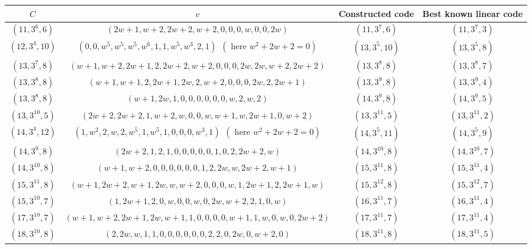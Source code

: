 \documentclass[sn-mathphys-num]{sn-jnl}%
\theoremstyle{thmstyleone}%
\theoremstyle{thmstyletwo}%
\theoremstyle{thmstylethree}%
\begin{document}
\begin{table}[h!]
	\begin{center}
		\begin{adjustbox}{width=\textwidth}
			\begin{tabular}{|c|c|c|c|}
				\hline
				$C$&$v$&Constructed code& Best known linear code\\
				\hline
				$(11,3^6,6)$&$(2w+1,w+2,2w+2,w+2,0,0,0,w,0,0,2w)$&$(11,3^7,6)$& $(11,3^7,3)$\\
				\hline
				$(12,3^{4},10)$&$( 0,0, w^5, w^5, w^5, w^6, 1, 1, w^5,w^3, 2, 1) \ \  (\text{ here }w^2+2w+2=0)$&$(13,3^{5},10)$& $(13,3^{5},8)$\\
				\hline 
				$(13,3^7,8)$&$(w+1,w+2,2w+1,2,2w+2,w+2,0,0,0,2w,2w,w+2,2w+2)$&$(13,3^8,8)$& $(13,3^8,7)$\\
				\hline
				$(13,3^8,8)$&$(w + 1, w + 1, 2, 2w + 1, 2w, 2, w + 2, 0, 0, 0, 2w, 2, 2w + 1)$&$(13,3^9,8)$& $(13,3^9,4)$\\
				\hline
				$(13,3^8,8)$&$(w+1, 2w, 1, 0, 0,  0,  0,  0, 0,  w, 2, w,  2)$&$(14,3^9,8)$& $(14,3^9,5)$\\
				\hline
				$(13,3^{10},5)$&$(2w+2,2w+2,1,w+2,w,0,0,w,w+1,w,2w+1,0,w+2)$&$(13,3^{11},5)$& $(13,3^{11},2)$\\
				\hline
				$(14,3^{4},12)$&$ (1, w^2,   2,   w,   2, w^5,   1, w^5,   1,   0,   0,   0, w^3,   1)\ \  (\text{ here }w^2+2w+2=0)$&$(14,3^{5},11)$& $(14,3^5,9)$\\
				\hline
				$(14,3^{9},8)$&$(2w + 2, 1, 2, 1, 0,0, 0, 0, 0, 1, 0, 2, 2w + 2, w)
				$&$(14,3^{10},8)$& $(14,3^{10},7)$\\
				\hline
				$(14,3^{10},8)$&$(w+1, w+2, 0, 0, 0, 0, 0, 0, 1, 2, 2w, w, 2w+2, w + 1)
				$&$(15,3^{11},8)$& $(15,3^{11},4)$\\
				\hline
				
				$(15,3^{11},8)$&$(w+1,2w +2, w+1, 2w, w, w +2, 0, 0, 0, w, 1, 2w+1, 2, 2w +1, w)
				$&$(15,3^{12},8)$& $(15,3^{12},7)$\\
				
				\hline
				$(15,3^{10},7)$&$(1,2w+1,2,0,w,0,0,w,0,2w,w+2,2,1,0,w)$&$(16,3^{11},7)$& $(16,3^{11},4)$\\
				\hline
				$(17,3^{10},7)$&$(w+1,w+2,2w+1,2w,w+1,1,0,0,0,0,w+1,1,w,0,w,0,2w+2)$&$(17,3^{11},7)$& $(17,3^{11},4)$\\
				\hline
				$(18,3^{10},8)$&$(2,2w,w,1,1,0,0,0,0,0,0,2,2,0,2w,0,w+2,0)$&$(18,3^{11},8)$& $(18,3^{11},5)$\\
				

\end{tabular}
\end{adjustbox}
\end{center}
\end{table}
\end{document}

